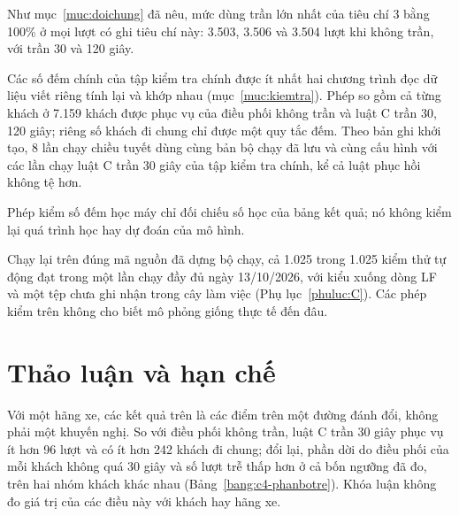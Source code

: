 Như mục~\ref{muc:doichung} đã nêu, mức dùng trần lớn nhất của tiêu chí 3 bằng 100\% ở mọi lượt có ghi tiêu chí này:
3.503, 3.506 và 3.504 lượt khi không trần, với trần 30 và 120 giây.

Các số đếm chính của tập kiểm tra chính được ít nhất hai chương trình đọc dữ liệu viết riêng tính lại và khớp nhau
(mục~\ref{muc:kiemtra}). Phép so gồm cả từng khách ở 7.159 khách được phục vụ của điều phối không trần và luật C trần
30, 120 giây; riêng số khách đi chung chỉ được một quy tắc đếm. Theo bản ghi khởi tạo, 8 lần chạy chiều tuyết dùng cùng
bản bộ chạy đã lưu và cùng cấu hình với các lần chạy luật C trần 30 giây của tập kiểm tra chính, kể cả luật phục hồi
không tệ hơn.

Phép kiểm số đếm học máy chỉ đối chiếu số học của bảng kết quả; nó không kiểm lại quá trình học hay dự đoán của mô hình.

Chạy lại trên đúng mã nguồn đã dựng bộ chạy, cả 1.025 trong 1.025 kiểm thử tự động đạt trong một lần chạy đầy đủ ngày
13/10/2026, với kiểu xuống dòng LF và một tệp chưa ghi nhận trong cây làm việc (Phụ lục~\ref{phuluc:C}). Các phép kiểm
trên không cho biết mô phỏng giống thực tế đến đâu.

\section{Thảo luận và hạn chế}
\label{muc:c4-thaoluan}

Với một hãng xe, các kết quả trên là các điểm trên một đường đánh đổi, không phải một khuyến nghị. So với điều phối
không trần, luật C trần 30 giây phục vụ ít hơn 96 lượt và có ít hơn 242 khách đi chung; đổi lại, phần dời do điều phối
của mỗi khách không quá 30 giây và số lượt trễ thấp hơn ở cả bốn ngưỡng đã đo, trên hai nhóm khách khác nhau
(Bảng~\ref{bang:c4-phanbotre}). Khóa luận không đo giá trị của các điều này với khách hay hãng xe.

